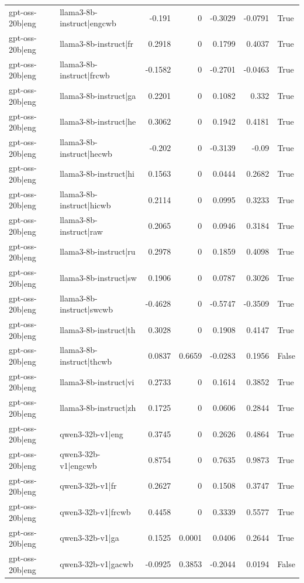 \begin{table}
\begin{tabular}{l l r r r r l}
gpt-oss-20b|eng & llama3-8b-instruct|engcwb & -0.191 & 0 & -0.3029 & -0.0791 & True \\
gpt-oss-20b|eng & llama3-8b-instruct|fr & 0.2918 & 0 & 0.1799 & 0.4037 & True \\
gpt-oss-20b|eng & llama3-8b-instruct|frcwb & -0.1582 & 0 & -0.2701 & -0.0463 & True \\
gpt-oss-20b|eng & llama3-8b-instruct|ga & 0.2201 & 0 & 0.1082 & 0.332 & True \\
gpt-oss-20b|eng & llama3-8b-instruct|he & 0.3062 & 0 & 0.1942 & 0.4181 & True \\
gpt-oss-20b|eng & llama3-8b-instruct|hecwb & -0.202 & 0 & -0.3139 & -0.09 & True \\
gpt-oss-20b|eng & llama3-8b-instruct|hi & 0.1563 & 0 & 0.0444 & 0.2682 & True \\
gpt-oss-20b|eng & llama3-8b-instruct|hicwb & 0.2114 & 0 & 0.0995 & 0.3233 & True \\
gpt-oss-20b|eng & llama3-8b-instruct|raw & 0.2065 & 0 & 0.0946 & 0.3184 & True \\
gpt-oss-20b|eng & llama3-8b-instruct|ru & 0.2978 & 0 & 0.1859 & 0.4098 & True \\
gpt-oss-20b|eng & llama3-8b-instruct|sw & 0.1906 & 0 & 0.0787 & 0.3026 & True \\
gpt-oss-20b|eng & llama3-8b-instruct|swcwb & -0.4628 & 0 & -0.5747 & -0.3509 & True \\
gpt-oss-20b|eng & llama3-8b-instruct|th & 0.3028 & 0 & 0.1908 & 0.4147 & True \\
gpt-oss-20b|eng & llama3-8b-instruct|thcwb & 0.0837 & 0.6659 & -0.0283 & 0.1956 & False \\
gpt-oss-20b|eng & llama3-8b-instruct|vi & 0.2733 & 0 & 0.1614 & 0.3852 & True \\
gpt-oss-20b|eng & llama3-8b-instruct|zh & 0.1725 & 0 & 0.0606 & 0.2844 & True \\
gpt-oss-20b|eng & qwen3-32b-v1|eng & 0.3745 & 0 & 0.2626 & 0.4864 & True \\
gpt-oss-20b|eng & qwen3-32b-v1|engcwb & 0.8754 & 0 & 0.7635 & 0.9873 & True \\
gpt-oss-20b|eng & qwen3-32b-v1|fr & 0.2627 & 0 & 0.1508 & 0.3747 & True \\
gpt-oss-20b|eng & qwen3-32b-v1|frcwb & 0.4458 & 0 & 0.3339 & 0.5577 & True \\
gpt-oss-20b|eng & qwen3-32b-v1|ga & 0.1525 & 0.0001 & 0.0406 & 0.2644 & True \\
gpt-oss-20b|eng & qwen3-32b-v1|gacwb & -0.0925 & 0.3853 & -0.2044 & 0.0194 & False \\

\end{tabular}
\end{table}
